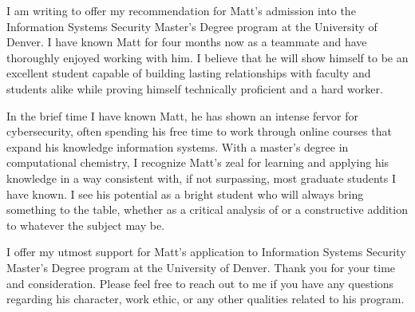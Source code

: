 \documentclass[12pt, a4paper]{awesome-cv}
\begin{document}
	
	\makecvheader[R]
	
	
	\makelettertitle
	
	\begin{cvletter}
		
		I am writing to offer my recommendation for Matt's admission into the Information Systems Security Master's Degree program at the University of Denver. 
		I have known Matt for four months now as a teammate and have thoroughly enjoyed working with him.
		I believe that he will show himself to be an excellent student capable of building lasting relationships with faculty and students alike while proving himself technically proficient and a hard worker.
		
		In the brief time I have known Matt, he has shown an intense fervor for cybersecurity, often spending his free time to work through online courses that expand his knowledge information systems. 
		With a master's degree in computational chemistry, I recognize Matt's zeal for learning and applying his knowledge in a way consistent with, if not surpassing, most graduate students I have known. 
		I see his potential as a bright student who will always bring something to the table, whether as a critical analysis of or a constructive addition to whatever the subject may be.
		
		I offer my utmost support for Matt's application to Information Systems Security Master's Degree program at the University of Denver. 
		Thank you for your time and consideration. 
		Please feel free to reach out to me if you have any questions regarding his character, work ethic, or any other qualities related to his program.
		
		
	\end{cvletter}
	
	
	\makeletterclosing
	
\end{document}
